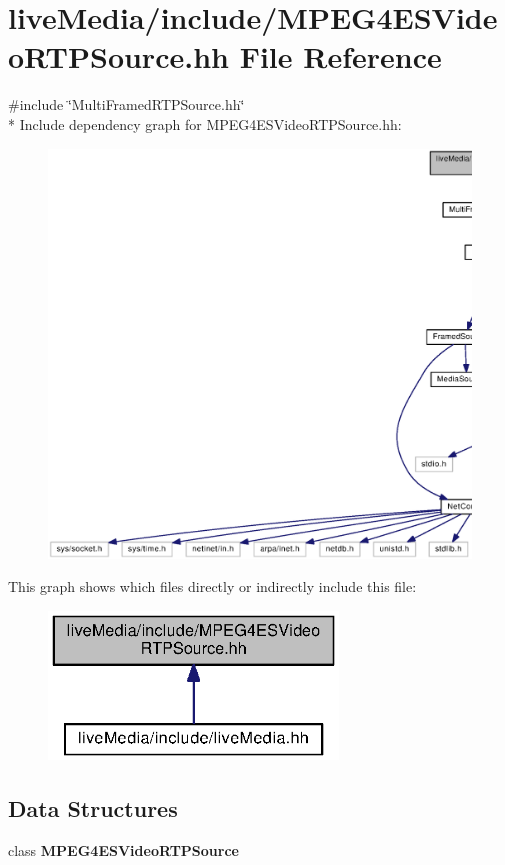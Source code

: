 \section{live\+Media/include/\+M\+P\+E\+G4\+E\+S\+Video\+R\+T\+P\+Source.hh File Reference}
\label{MPEG4ESVideoRTPSource_8hh}
{\ttfamily \#include \char`\"{}Multi\+Framed\+R\+T\+P\+Source.\+hh\char`\"{}}\\*
Include dependency graph for M\+P\+E\+G4\+E\+S\+Video\+R\+T\+P\+Source.\+hh\+:
\nopagebreak
\begin{figure}[H]
\begin{center}
\leavevmode
\includegraphics[width=350pt]{MPEG4ESVideoRTPSource_8hh__incl}
\end{center}
\end{figure}
This graph shows which files directly or indirectly include this file\+:
\nopagebreak
\begin{figure}[H]
\begin{center}
\leavevmode
\includegraphics[width=218pt]{MPEG4ESVideoRTPSource_8hh__dep__incl}
\end{center}
\end{figure}
\subsection*{Data Structures}
\begin{DoxyCompactItemize}
\item 
class {\bf M\+P\+E\+G4\+E\+S\+Video\+R\+T\+P\+Source}
\end{DoxyCompactItemize}
